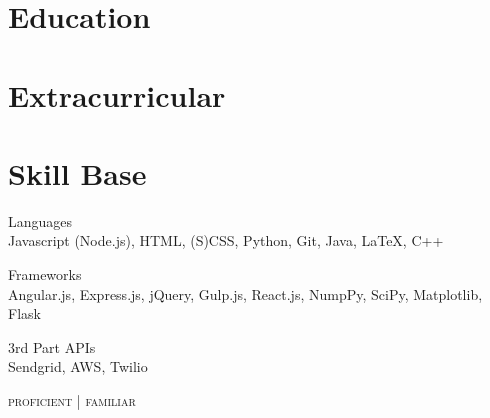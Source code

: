 \documentclass[9pt]{article}
\begin{document}
        \begin{minipage}[t]{0.35\textwidth}
            \vspace{0pt}

            \section{Education}

                

                

            \section{Extracurricular}

                

                

                

            \section{Skill Base}
            {\raggedright
                Languages \\
                {\small
                    {\color{highlight}
                        Javascript (Node.js), HTML, (S)CSS, Python, Git,
                    }
                    Java, LaTeX, C++
                }
                \vspace{5pt}

                Frameworks \\
                {\small
                    {\color{highlight}
                        Angular.js, Express.js, jQuery, Gulp.js,
                    }
                    React.js, NumpPy, SciPy, Matplotlib, Flask \\
                }

                \vspace{5pt}

                3rd Part APIs \\
                {\small
                    {\color{highlight}
                        Sendgrid, AWS,
                    }
                    Twilio
                }

                \hfill\textsc{\footnotesize{{\color{highlight} proficient} | familiar}}
            }
        \end{minipage}
\end{document}
